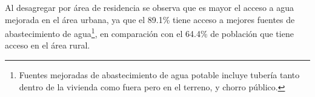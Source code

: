 Al desagregar por área de residencia se observa que es mayor el acceso a agua mejorada en el área urbana, ya que el 89.1\% tiene acceso a mejores fuentes de abastecimiento de agua\footnote{Fuentes mejoradas de abastecimiento de agua potable incluye tubería tanto  dentro de la vivienda como  fuera pero en el terreno, y chorro público.}, en comparación con el 64.4\% de población que tiene acceso en el área rural.